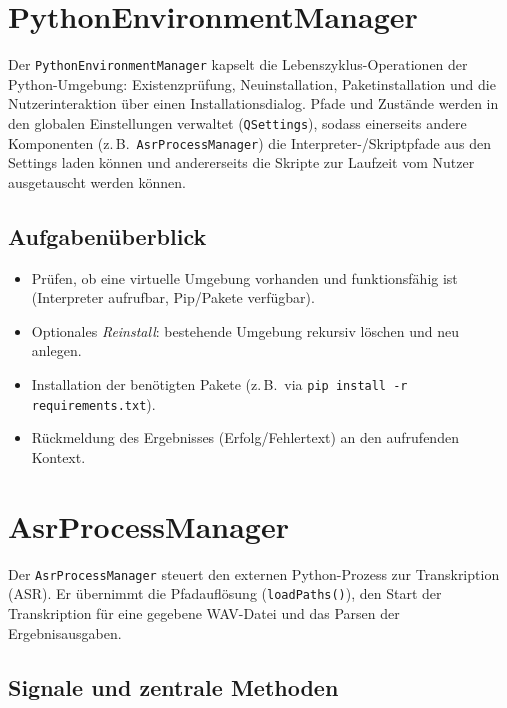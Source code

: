\section{PythonEnvironmentManager}
\label{sec:py_env}

Der \texttt{PythonEnvironmentManager} kapselt die Lebenszyklus-Operationen der Python-Umgebung: Existenzprüfung, Neuinstallation, Paketinstallation und die Nutzerinteraktion über einen Installationsdialog. Pfade und Zustände werden in den globalen Einstellungen verwaltet (\texttt{QSettings}), sodass einerseits andere Komponenten (z.\,B.\ \texttt{AsrProcessManager}) die Interpreter-/Skriptpfade aus den Settings laden können und andererseits die Skripte zur Laufzeit vom Nutzer ausgetauscht werden können.


\subsection*{Aufgabenüberblick}

\begin{itemize}
    \item Prüfen, ob eine virtuelle Umgebung vorhanden und funktionsfähig ist (Interpreter aufrufbar, Pip/Pakete verfügbar).

    \item Optionales \textit{Reinstall}: bestehende Umgebung rekursiv löschen und neu anlegen.

    \item Installation der benötigten Pakete (z.\,B.\ via \texttt{pip install -r requirements.txt}).

    \item Rückmeldung des Ergebnisses (Erfolg/Fehlertext) an den aufrufenden Kontext.
\end{itemize}



\section{AsrProcessManager}
\label{sec:py_asr}

Der \texttt{AsrProcessManager} steuert den externen Python-Prozess zur Transkription (ASR). Er übernimmt die Pfadauflösung (\texttt{loadPaths()}), den Start der Transkription für eine gegebene WAV-Datei und das Parsen der Ergebnisausgaben.\\


\subsection*{Signale und zentrale Methoden}

